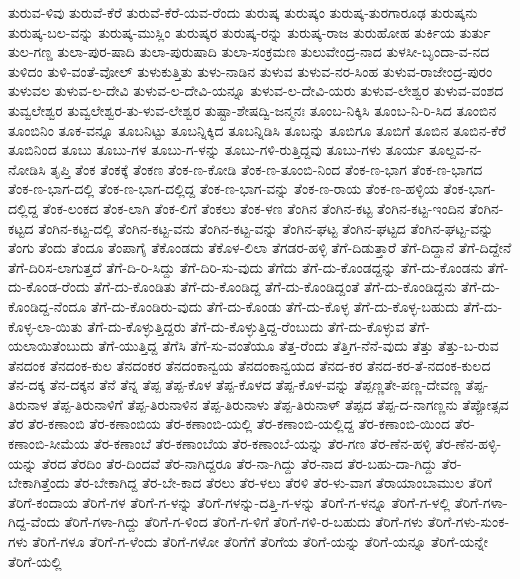 ತುರುವ-ಳಿವು
ತುರುವೆ-ಕೆರೆ
ತುರುವೆ-ಕೆರೆ-ಯವ-ರೆಂದು
ತುರುಷ್ಕ
ತುರುಷ್ಕಂ
ತುರುಷ್ಕ-ತುರಗಾರೂಢ
ತುರುಷ್ಕನು
ತುರುಷ್ಕ-ಬಲ-ವನ್ನು
ತುರುಷ್ಕ-ಮುಸ್ಲಿಂ
ತುರುಷ್ಕರ
ತುರುಷ್ಕ-ರನ್ನು
ತುರುಷ್ಕ-ರಾಜ
ತುರುಹೋಹ
ತುರ್ಕಿಯ
ತುರ್ತು
ತುಲ-ಗಣ್ಡ
ತುಲಾ-ಪುರ-ಷಾದಿ
ತುಲಾ-ಪುರುಷಾದಿ
ತುಲಾ-ಸಂಕ್ರಮಣ
ತುಲುವೇಂದ್ರ-ನಾದ
ತುಳಸೀ-ಬೃಂದಾ-ವ-ನದ
ತುಳಿದಂ
ತುಳಿ-ವಂತೆ-ವೋಲ್
ತುಳುಕುತ್ತಿತು
ತುಳು-ನಾಡಿನ
ತುಳುವ
ತುಳುವ-ನರ-ಸಿಂಹ
ತುಳುವ-ರಾಜೇಂದ್ರ-ಪುರಂ
ತುಳುವಲ
ತುಳುವ-ಲ-ದೇವಿ
ತುಳುವ-ಲ-ದೇವಿ-ಯನ್ನೂ
ತುಳುವ-ಲ-ದೇವಿ-ಯರು
ತುಳುವ-ಲೇಶ್ವರ
ತುಳುವ-ವಂಶದ
ತುವ್ವಲೇಶ್ವರ
ತುವ್ವಲೇಶ್ವರ-ತು-ಳುವ-ಲೇಶ್ವರ
ತುಷ್ಟಾ-ಶೇಷದ್ವಿ-ಜನ್ಮನಃ
ತೂಂಬ-ನಿಕ್ಕಿಸಿ
ತೂಂಬ-ನಿ-ರಿ-ಸಿದ
ತೂಂಬಿನ
ತೂಂಬಿನಿಂ
ತೂಕ-ವನ್ನೂ
ತೂಬನಿಟ್ಟು
ತೂಬನ್ನಿಕ್ಕಿದ
ತೂಬನ್ನಿಡಿಸಿ
ತೂಬನ್ನು
ತೂಬಿಗೂ
ತೂಬಿಗೆ
ತೂಬಿನ
ತೂಬಿನ-ಕೆರೆ
ತೂಬಿನಿಂದ
ತೂಬು
ತೂಬು-ಗಳ
ತೂಬು-ಗ-ಳನ್ನು
ತೂಬು-ಗಳಿ-ರುತ್ತಿದ್ದವು
ತೂಬು-ಗಳು
ತೂರ್ಯ
ತೂಲ್ದವ-ನ-ನೋಡಿಸಿ
ತೃಪ್ತಿ
ತೆಂಕ
ತೆಂಕಕ್ಕೆ
ತೆಂಕಣ
ತೆಂಕ-ಣ-ಕೋಡಿ
ತೆಂಕ-ಣ-ತೂಂಬಿ-ನಿಂದ
ತೆಂಕ-ಣ-ಭಾಗ
ತೆಂಕ-ಣ-ಭಾಗದ
ತೆಂಕ-ಣ-ಭಾಗ-ದಲ್ಲಿ
ತೆಂಕ-ಣ-ಭಾಗ-ದಲ್ಲಿದ್ದ
ತೆಂಕ-ಣ-ಭಾಗ-ವನ್ನು
ತೆಂಕ-ಣ-ರಾಯ
ತೆಂಕ-ಣ-ಹಳ್ಳಿಯ
ತೆಂಕ-ಭಾಗ-ದಲ್ಲಿದ್ದ
ತೆಂಕ-ಲಂಕದ
ತೆಂಕ-ಲಾಗಿ
ತೆಂಕ-ಲಿಗೆ
ತೆಂಕಲು
ತೆಂಕ-ಳಣ
ತೆಂಗಿನ
ತೆಂಗಿನ-ಕಟ್ಟ
ತೆಂಗಿನ-ಕಟ್ಟ-ಇಂದಿನ
ತೆಂಗಿನ-ಕಟ್ಟದ
ತೆಂಗಿನ-ಕಟ್ಟ-ದಲ್ಲಿ
ತೆಂಗಿನ-ಕಟ್ಟ-ವನು
ತೆಂಗಿನ-ಕಟ್ಟ-ವನ್ನು
ತೆಂಗಿನ-ಘಟ್ಟ
ತೆಂಗಿನ-ಘಟ್ಟದ
ತೆಂಗಿನ-ಘಟ್ಟ-ವನ್ನು
ತೆಂಗು
ತೆಂದು
ತೆಂದೂ
ತೆಂಪಾಗೈ
ತೆಕೊಂಡದು
ತೆಕೊಳ-ಲಿಲಾ
ತೆಗಡರ-ಹಳ್ಳಿ
ತೆಗೆ-ದಿಡುತ್ತಾರೆ
ತೆಗೆ-ದಿದ್ದಾನೆ
ತೆಗೆ-ದಿದ್ದೇನೆ
ತೆಗೆ-ದಿರಿಸ-ಲಾಗುತ್ತದೆ
ತೆಗೆ-ದಿ-ರಿ-ಸಿದ್ದು
ತೆಗೆ-ದಿರಿ-ಸು-ವುದು
ತೆಗೆದು
ತೆಗೆ-ದು-ಕೊಂಡದ್ದನ್ನು
ತೆಗೆ-ದು-ಕೊಂಡನು
ತೆಗೆ-ದು-ಕೊಂಡ-ರೆಂದು
ತೆಗೆ-ದು-ಕೊಂಡಿತು
ತೆಗೆ-ದು-ಕೊಂಡಿದ್ದ
ತೆಗೆ-ದು-ಕೊಂಡಿದ್ದಂತೆ
ತೆಗೆ-ದು-ಕೊಂಡಿದ್ದನು
ತೆಗೆ-ದು-ಕೊಂಡಿದ್ದ-ನೆಂದೂ
ತೆಗೆ-ದು-ಕೊಂಡಿರು-ವುದು
ತೆಗೆ-ದು-ಕೊಂಡು
ತೆಗೆ-ದು-ಕೊಳ್ಳ
ತೆಗೆ-ದು-ಕೊಳ್ಳ-ಬಹುದು
ತೆಗೆ-ದು-ಕೊಳ್ಳ-ಲಾ-ಯಿತು
ತೆಗೆ-ದು-ಕೊಳ್ಳುತ್ತಿದ್ದರು
ತೆಗೆ-ದು-ಕೊಳ್ಳುತ್ತಿದ್ದ-ರೆಂಬುದು
ತೆಗೆ-ದು-ಕೊಳ್ಳುವ
ತೆಗೆ-ಯಲಾಯಿತೆಂಬುದು
ತೆಗೆ-ಯುತ್ತಿದ್ದ
ತೆಗೆಸಿ
ತೆಗೆ-ಸು-ವಂತೆಯೂ
ತೆತ್ತ-ರೆಂದು
ತೆತ್ತಿಗ-ನೆನೆ-ವುದು
ತೆತ್ತು
ತೆತ್ತು-ಬ-ರುವ
ತೆನದಂಕ
ತೆನದಂಕ-ಕುಲ
ತೆನದಂಕರ
ತೆನದಂಕಾನ್ವಯ
ತೆನದಂಕಾನ್ವಯದ
ತೆನದ-ಕರ
ತೆನದ-ಕರ-ತೆ-ನದಂಕ-ಕುಲದ
ತೆನ-ದಕ್ಕ
ತೆನ-ದಕ್ಕನ
ತೆನೆ
ತೆನ್ನ
ತೆಪ್ಪ
ತೆಪ್ಪ-ಕೊಳ
ತೆಪ್ಪ-ಕೊಳದ
ತೆಪ್ಪ-ಕೊಳ-ವನ್ನು
ತೆಪ್ಪಣ್ಣತೇ-ಪಣ್ಣ-ದೇವಣ್ಣ
ತೆಪ್ಪ-ತಿರುನಾಳ
ತೆಪ್ಪ-ತಿರುನಾಳಿಗೆ
ತೆಪ್ಪ-ತಿರುನಾಳಿನ
ತೆಪ್ಪ-ತಿರುನಾಳು
ತೆಪ್ಪ-ತಿರುನಾಳ್
ತೆಪ್ಪದ
ತೆಪ್ಪ-ದ-ನಾಗಣ್ಣನು
ತೆಪ್ಪೋತ್ಸವ
ತೆರ
ತೆರ-ಕಣಾಂಬಿ
ತೆರ-ಕಣಾಂಬಿಯ
ತೆರ-ಕಣಾಂಬಿ-ಯಲ್ಲಿ
ತೆರ-ಕಣಾಂಬಿ-ಯಲ್ಲಿದ್ದ
ತೆರ-ಕಣಾಂಬಿ-ಯಿಂದ
ತೆರ-ಕಣಾಂಬಿ-ಸೀಮೆಯ
ತೆರ-ಕಣಾಂಬೆ
ತೆರ-ಕಣಾಂಬೆಯ
ತೆರ-ಕಣಾಂಬೆ-ಯನ್ನು
ತೆರ-ಗಣ
ತೆರ-ಣೆನ-ಹಳ್ಳಿ
ತೆರ-ಣೆನ-ಹಳ್ಳಿ-ಯನ್ನು
ತೆರದ
ತೆರದಿಂ
ತೆರ-ದಿಂದವೆ
ತೆರ-ನಾಗಿದ್ದರೂ
ತೆರ-ನಾ-ಗಿದ್ದು
ತೆರ-ನಾದ
ತೆರ-ಬಹು-ದಾ-ಗಿದ್ದು
ತೆರ-ಬೇಕಾಗಿತ್ತೆಂದು
ತೆರ-ಬೇಕಾಗಿದ್ದ
ತೆರ-ಬೇ-ಕಾದ
ತೆರಲು
ತೆರ-ಳಲು
ತೆರಳಿ
ತೆರ-ಳು-ವಾಗ
ತೆರಾಯಾಂಬಾಮುಲ
ತೆರಿಗೆ
ತೆರಿಗೆ-ಕಂದಾಯ
ತೆರಿಗೆ-ಗಳ
ತೆರಿಗೆ-ಗ-ಳನ್ನು
ತೆರಿಗೆ-ಗಳನ್ನು-ದತ್ತಿ-ಗ-ಳನ್ನು
ತೆರಿಗೆ-ಗ-ಳನ್ನೂ
ತೆರಿಗೆ-ಗ-ಳಲ್ಲಿ
ತೆರಿಗೆ-ಗಳಾ-ಗಿದ್ದ-ವೆಂದು
ತೆರಿಗೆ-ಗಳಾ-ಗಿದ್ದು
ತೆರಿಗೆ-ಗ-ಳಿಂದ
ತೆರಿಗೆ-ಗ-ಳಿಗೆ
ತೆರಿಗೆ-ಗಳಿ-ರ-ಬಹುದು
ತೆರಿಗೆ-ಗಳು
ತೆರಿಗೆ-ಗಳು-ಸುಂಕ-ಗಳು
ತೆರಿಗೆ-ಗಳೂ
ತೆರಿಗೆ-ಗ-ಳೆಂದು
ತೆರಿಗೆ-ಗಳೋ
ತೆರಿಗೆಗೆ
ತೆರಿಗೆಯ
ತೆರಿಗೆ-ಯನ್ನು
ತೆರಿಗೆ-ಯನ್ನೂ
ತೆರಿಗೆ-ಯನ್ನೇ
ತೆರಿಗೆ-ಯಲ್ಲಿ
